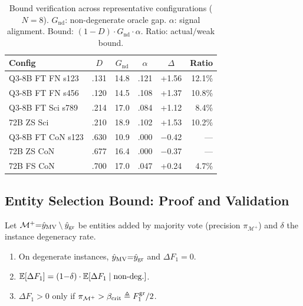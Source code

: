 \begin{table}[t]
\centering
\footnotesize
\setlength{\tabcolsep}{3pt}
\caption{Bound verification across representative configurations ($N{=}8$). $G_{\text{nd}}$: non-degenerate oracle gap. $\alpha$: signal alignment. Bound: $(1{-}D) \cdot G_{\text{nd}} \cdot \alpha$. Ratio: actual$/$weak bound.}
\label{tab:bound_verification}
\begin{tabular}{@{}lccccr@{}}
\toprule
Config & $D$ & $G_{\text{nd}}$ & $\alpha$ & $\Delta$ & Ratio \\
\midrule
Q3-8B FT FN s123 & .131 & 14.8 & .121 & +1.56 & 12.1\% \\
Q3-8B FT FN s456 & .120 & 14.5 & .108 & +1.37 & 10.8\% \\
Q3-8B FT Sci s789 & .214 & 17.0 & .084 & +1.12 & 8.4\% \\
72B ZS Sci & .210 & 18.9 & .102 & +1.53 & 10.2\% \\
Q3-8B FT CoN s123 & .630 & 10.9 & .000 & $-$0.42 & --- \\
72B ZS CoN & .677 & 16.4 & .000 & $-$0.37 & --- \\
72B FS CoN & .700 & 17.0 & .047 & +0.24 & 4.7\% \\
\bottomrule
\end{tabular}
\end{table}

\subsection{Entity Selection Bound: Proof and Validation}\label{app:alpha_crit}

\begin{proposition}\label{prop:entity_selection_bound}
Let $\mathcal{M}^+ {=} \hat{y}_{\textup{MV}} \setminus \hat{y}_{\textup{gr}}$ be entities added by majority vote (precision $\pi_{\mathcal{M}^+}$) and $\delta$ the instance degeneracy rate.
\begin{enumerate}[label=\textup{(\alph*)},nosep,leftmargin=*]
\item On degenerate instances, $\hat{y}_{\textup{MV}} {=} \hat{y}_{\textup{gr}}$ and $\Delta F_1 {=} 0$.
\item $\mathbb{E}[\Delta F_1] = (1{-}\delta) \cdot \mathbb{E}[\Delta F_1 \mid \textup{non-deg.}]$.
\item $\Delta F_1 > 0$ only if $\pi_{\mathcal{M}^+} > \beta_{\textup{crit}} \triangleq F_1^{\textup{gr}}/2$.
\end{enumerate}
\end{proposition}

